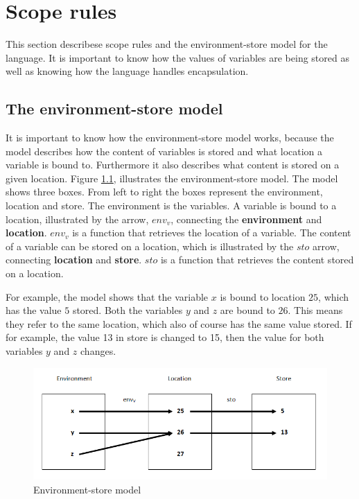 \chapter{Scope rules}\label{chap:scope-rules}
This section describese scope rules and the environment-store model for the language. It is important to know how the values of variables are being stored as well as knowing how the language handles encapsulation. 

\section{The environment-store model}\label{sec:es-model}
It is important to know how the environment-store model works, because the model describes how the content of variables is stored and what location a variable is bound to. Furthermore it also describes what content is stored on a given location. Figure \ref{fig:esmodel}, illustrates the environment-store model. The model shows three boxes. From left to right the boxes represent the environment, location and store. The environment is the variables. A variable is bound to a location, illustrated by the arrow, $env_v$, connecting the \textbf{environment} and \textbf{location}. $env_v$ is a function that retrieves the location of a variable. The content of a variable can be stored on a location, which is illustrated by the $sto$ arrow, connecting \textbf{location} and \textbf{store}. $sto$ is a function that retrieves the content stored on a location. 

For example, the model shows that the variable $x$ is bound to location $25$, which has the value $5$ stored. Both the variables $y$ and $z$ are bound to $26$. This means they refer to the same location, which also of course has the same value stored. If for example, the value 13 in store is changed to 15, then the value for both variables $y$ and $z$ changes.
\begin{figure}[H]
\includegraphics{billeder/environment_store_model.png}
\caption{Environment-store model}
\label{fig:esmodel}
\end{figure}


